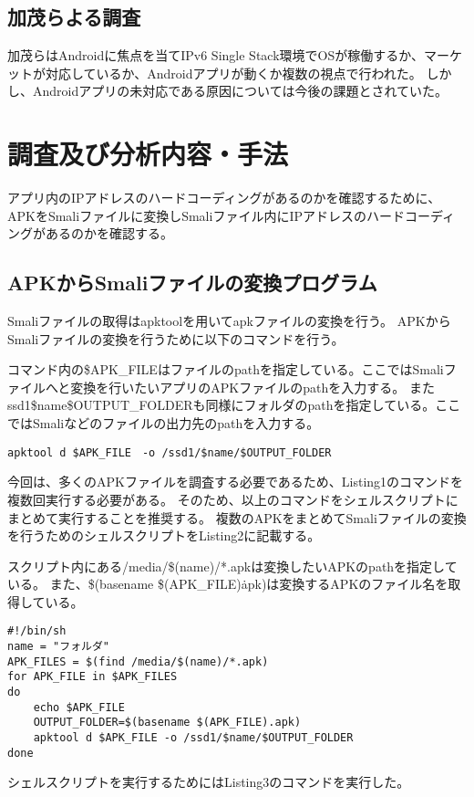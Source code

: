 \documentclass[a4j]{jarticle}
\begin{document}
\subsection{加茂らよる調査}
加茂らはAndroidに焦点を当てIPv6 Single Stack環境でOSが稼働するか、マーケットが対応しているか、Androidアプリが動くか複数の視点で行われた。
しかし、Androidアプリの未対応である原因については今後の課題とされていた。

\newpage
\section{調査及び分析内容・手法}
アプリ内のIPアドレスのハードコーディングがあるのかを確認するために、APKをSmaliファイルに変換しSmaliファイル内にIPアドレスのハードコーディングがあるのかを確認する。
\subsection{APKからSmaliファイルの変換プログラム}
Smaliファイルの取得はapktoolを用いてapkファイルの変換を行う。
APKからSmaliファイルの変換を行うために以下のコマンドを行う。

コマンド内の\$APK\_FILEはファイルのpathを指定している。ここではSmaliファイルへと変換を行いたいアプリのAPKファイルのpathを入力する。
また\/ssd1\/\$name\/\$OUTPUT\_FOLDERも同様にフォルダのpathを指定している。ここではSmaliなどのファイルの出力先のpathを入力する。

\begin{lstlisting}[caption=APKからSmaliファイルの変換のコマンド]
	apktool d $APK_FILE　-o /ssd1/$name/$OUTPUT_FOLDER
\end{lstlisting}

今回は、多くのAPKファイルを調査する必要であるため、Listing1のコマンドを複数回実行する必要がある。
そのため、以上のコマンドをシェルスクリプトにまとめて実行することを推奨する。
複数のAPKをまとめてSmaliファイルの変換を行うためのシェルスクリプトをListing2に記載する。

スクリプト内にある/media/\$(name)/*.apkは変換したいAPKのpathを指定している。
また、\$(basename \$(APK\_FILE)\.apk)は変換するAPKのファイル名を取得している。
\begin{lstlisting}[caption=複数のAPKからSmaliファイルの変換を行うシェルスクリプト]
#!/bin/sh
name = "フォルダ"
APK_FILES = $(find /media/$(name)/*.apk)
for APK_FILE in $APK_FILES
do
	echo $APK_FILE
	OUTPUT_FOLDER=$(basename $(APK_FILE).apk)
	apktool d $APK_FILE -o /ssd1/$name/$OUTPUT_FOLDER
done
\end{lstlisting}
シェルスクリプトを実行するためにはListing3のコマンドを実行した。
\end{document}
